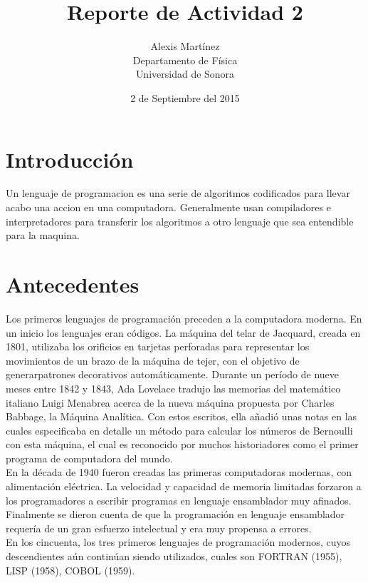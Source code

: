 \documentclass{article}
\title{Reporte de Actividad 2}
\author{Alexis Martínez \\
Departamento de Física \\
Universidad de Sonora}
\date{2 de Septiembre del 2015}
\begin{document}
\maketitle

\section{Introducción}
Un lenguaje de programacion es una serie de algoritmos codificados para llevar acabo una accion en una computadora. Generalmente usan compiladores e interpretadores para transferir los algoritmos a otro lenguaje que sea entendible para la maquina.

\section{Antecedentes}
Los primeros lenguajes de programación preceden a la computadora moderna. En un inicio los lenguajes eran códigos. La máquina del telar de Jacquard, creada en 1801, utilizaba los orificios en tarjetas perforadas para representar los movimientos de un brazo de la máquina de tejer, con el objetivo de generarpatrones decorativos automáticamente. Durante un período de nueve meses entre 1842 y 1843, Ada Lovelace tradujo las memorias del matemático italiano Luigi Menabrea acerca de la nueva máquina propuesta por Charles Babbage, la Máquina Analítica. Con estos escritos, ella añadió unas notas en las cuales especificaba en detalle un método para calcular los números de Bernoulli con esta máquina, el cual es reconocido por muchos historiadores como el primer programa de computadora del mundo. \\
En la década de 1940 fueron creadas las primeras computadoras modernas, con alimentación eléctrica. La velocidad y capacidad de memoria limitadas forzaron a los programadores a escribir programas en lenguaje ensamblador muy afinados. Finalmente se dieron cuenta de que la programación en lenguaje ensamblador requería de un gran esfuerzo intelectual y era muy propensa a errores. \\
En los cincuenta, los tres primeros lenguajes de programación modernos, cuyos descendientes aún continúan siendo utilizados, cuales son FORTRAN (1955), LISP (1958), COBOL (1959).\\
\end{document}
